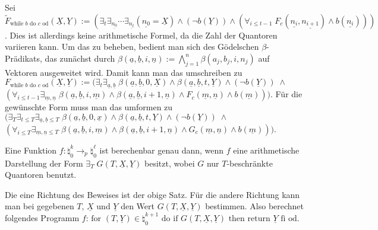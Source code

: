 \begin{Beweis}
    Sei $\widetilde{F}_{\text{while } b \text{ do } c \text{ od}}(\underline{X}, \underline{Y}) :=
    (\exists_t \exists_{\underline{n_0}} \dotsb \exists_{\underline{n_t}}
    (\underline{n_0} = \underline{X}) \land (\lnot b(\underline{Y})) \land
    (\forall_{i \le t - 1}\; F_c(\underline{n_i}, \underline{n_{i+1}}) \land b(\underline{n_i})))$.
    Dies ist allerdings keine arithmetische Formel, da die Zahl der Quantoren variieren kann.
    Um das zu beheben, bedient man sich des Gödelschen $\beta$-Prädikats, das zunächst durch
    $\beta(\underline{a}, \underline{b}, i, \underline{n}) :=
    \bigwedge_{j=1}^n \beta(a_j, b_j, i, n_j)$ auf Vektoren ausgeweitet wird.
    Damit kann man das umschreiben zu\\
    $F_{\text{while } b \text{ do } c \text{ od}}(\underline{X}, \underline{Y}) :=
    (\exists_t \exists_{\underline{a}, \underline{b}}\;
    \beta(\underline{a}, \underline{b}, 0, \underline{X}) \land
    \beta(\underline{a}, \underline{b}, t, \underline{Y}) \land (\lnot b(\underline{Y})) \;\land$\\
    $(\forall_{i \le t - 1} \exists_{\underline{m}, \underline{n}}\;
    \beta(\underline{a}, \underline{b}, i, \underline{m}) \land
    \beta(\underline{a}, \underline{b}, i + 1, \underline{n}) \land
    F_c(\underline{m}, \underline{n}) \land b(\underline{m})))$.
    Für die gewünschte Form muss man das umformen zu
    $(\exists_T \exists_{t \le T} \exists_{\underline{a}, \underline{b} \le T}\;
    \beta(\underline{a}, \underline{b}, 0, \underline{x}) \land
    \beta(\underline{a}, \underline{b}, t, \underline{Y}) \land (\lnot b(\underline{Y})) \;\land$\\
    $(\forall_{i \le T} \exists_{\underline{m}, \underline{n} \le T}\;
    \beta(\underline{a}, \underline{b}, i, \underline{m}) \land
    \beta(\underline{a}, \underline{b}, i + 1, \underline{n}) \land
    G_c(\underline{m}, \underline{n}) \land b(\underline{m})))$.
\end{Beweis}

\linie
\pagebreak

\begin{Kor}
    Eine Funktion $f\colon \natural_0^k \rightarrow_p \natural_0^\ell$ ist berechenbar genau dann,
    wenn $f$ eine arithmetische Darstellung der Form
    $\exists_T\; G(T, \underline{X}, \underline{Y})$ besitzt, wobei $G$ nur $T$-beschränkte
    Quantoren benutzt.
\end{Kor}

\begin{Beweis}
    Die eine Richtung des Beweises ist der obige Satz.
    Für die andere Richtung kann man bei gegebenen $T$, $\underline{X}$ und $\underline{Y}$
    den Wert $G(T, \underline{X}, \underline{Y})$ bestimmen.
    Also berechnet folgendes Programm $f$:
    $\text{for } (T, \underline{Y}) \in \natural_0^{k+1} \text{ do}
    \text{ if } G(T, \underline{X}, \underline{Y}) \text{ then} \text{ return } \underline{Y}
    \text{ fi} \text{ od}$.
\end{Beweis}


